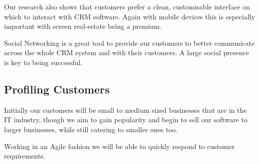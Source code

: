 \documentclass[DIV=calc, paper=a4, fontsize=11pt]{scrartcl}	 %
\begin{document}
Our research also shows that customers prefer a clean, customisable interface on which to interact
with CRM software. Again with mobile devices this is especially important with screen real-estate
being a premium.

Social Networking is a great tool to provide our customers to better communicate across the whole
CRM system and with their customers. A large social presence is key to being successful.

\subsection{Profiling Customers}
Initially our customers will be small to medium sized businesses that are in the IT industry, 
though we aim to gain popularity and begin to sell our software to larger businesses, while still
catering to smaller ones too.

Working in an Agile fashion we will be able to quickly respond to customer requirements.
\end{document}
